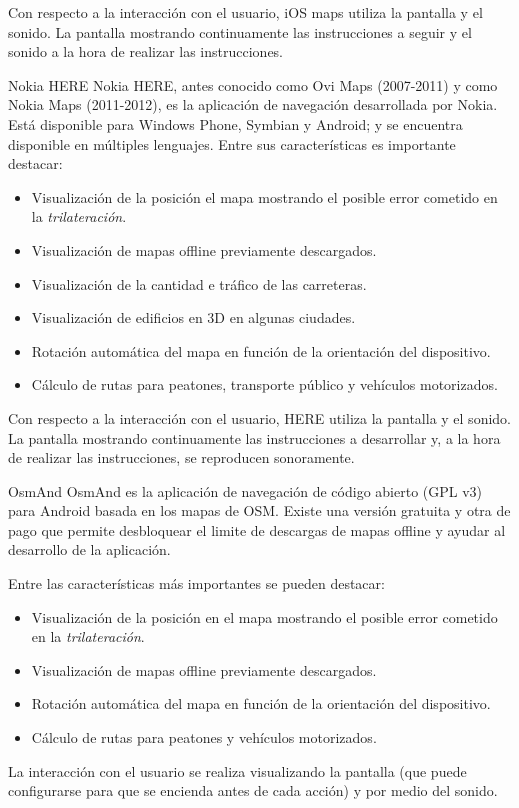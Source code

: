 \begin{definitionlist}
    Con respecto a la interacción con el usuario, iOS maps utiliza la pantalla y el sonido. La
    pantalla mostrando continuamente las instrucciones a seguir y el sonido a la hora de realizar
    las instrucciones.

  \item[Nokia HERE] Nokia HERE, antes conocido como Ovi Maps (2007-2011) y como Nokia Maps
    (2011-2012), es la aplicación de navegación desarrollada por Nokia. Está disponible para Windows
    Phone, Symbian y Android; y se encuentra disponible en múltiples lenguajes. Entre sus
    características es importante destacar:

    \begin{itemize}
      \item Visualización de la posición el mapa mostrando el posible error cometido en la
        \emph{trilateración}.
      \item Visualización de mapas offline previamente descargados.
      \item Visualización de la cantidad e tráfico de las carreteras.
      \item Visualización de edificios en 3D en algunas ciudades.
      \item Rotación automática del mapa en función de la orientación del dispositivo.
      \item Cálculo de rutas para peatones, transporte público y vehículos motorizados.
    \end{itemize}

    Con respecto a la interacción con el usuario, HERE utiliza la pantalla y el sonido. La
    pantalla mostrando continuamente las instrucciones a desarrollar y, a la hora de realizar
    las instrucciones, se reproducen sonoramente.

  \item[OsmAnd] OsmAnd es la aplicación de navegación de código abierto (GPL v3) para Android basada
    en los mapas de \acf{OSM}. Existe una versión gratuita y otra de pago que permite desbloquear el
    limite de descargas de mapas offline y ayudar al desarrollo de la aplicación.

    Entre las características más importantes se pueden destacar:

    \begin{itemize}
      \item Visualización de la posición en el mapa mostrando el posible error cometido en la
        \emph{trilateración}.
      \item Visualización de mapas offline previamente descargados.
      \item Rotación automática del mapa en función de la orientación del dispositivo.
      \item Cálculo de rutas para peatones y vehículos motorizados.
    \end{itemize}

    La interacción con el usuario se realiza visualizando la pantalla (que puede configurarse para
    que se encienda antes de cada acción) y por medio del sonido.

\end{definitionlist}

